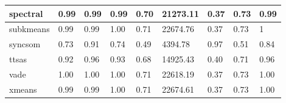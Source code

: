 \begin{table}[H]
\begin{tabular}{|l|l|l|l|l|l|l|l|l|}
\hline
spectral & 0.99 & 0.99 & 0.99 & 0.70 & 21273.11 & 0.37 & 0.73 & 0.99 \\
\hline
subkmeans & 0.99 & 0.99 & 1.00 & 0.71 & 22674.76 & 0.37 & 0.73 & 1 \\
\hline
syncsom & 0.73 & 0.91 & 0.74 & 0.49 & 4394.78 & 0.97 & 0.51 & 0.84 \\
\hline
ttsas & 0.92 & 0.96 & 0.93 & 0.68 & 14925.43 & 0.40 & 0.71 & 0.96 \\
\hline
vade & 1.00 & 1.00 & 1.00 & 0.71 & 22618.19 & 0.37 & 0.73 & 1.00 \\
\hline
xmeans & 0.99 & 0.99 & 1.00 & 0.71 & 22674.61 & 0.37 & 0.73 & 1.00 \\
\hline
\end{tabular}
\end{table}



